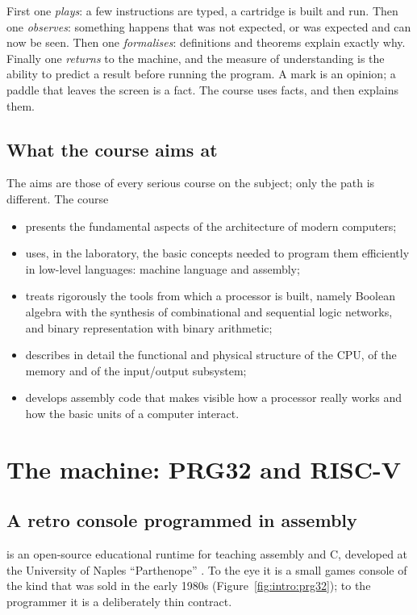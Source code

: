First one \emph{plays}: a few instructions are typed, a cartridge is built and
run. Then one \emph{observes}: something happens that was not expected, or was
expected and can now be seen. Then one \emph{formalises}: definitions and
theorems explain exactly why. Finally one \emph{returns} to the machine,
and the measure of understanding is the ability to predict a result before
running the program. A mark is an opinion; a paddle that leaves the screen is
a fact. The course uses facts, and then explains them.

\subsection{What the course aims at}

The aims are those of every serious course on the subject; only the path is
different. The course

\begin{itemize}
\item presents the fundamental aspects of the architecture of modern computers;
\item uses, in the laboratory, the basic concepts needed to program them
  efficiently in low-level languages: machine language and assembly;
\item treats rigorously the tools from which a processor is built, namely
  Boolean algebra with the synthesis of combinational and sequential logic
  networks, and binary representation with binary arithmetic;
\item describes in detail the functional and physical structure of the CPU, of
  the memory and of the input/output subsystem;
\item develops assembly code that makes visible how a processor really works
  and how the basic units of a computer interact.
\end{itemize}

\section{The machine: PRG32 and RISC-V}

\subsection{A retro console programmed in assembly}

\prg is an open-source educational runtime for teaching \riscv assembly and C,
developed at the University of Naples ``Parthenope'' \citep{prg32repo}. To
the eye it is a small games console of the kind that was sold in the early
1980s (Figure~\ref{fig:intro:prg32}); to the programmer it is a deliberately
thin contract.


